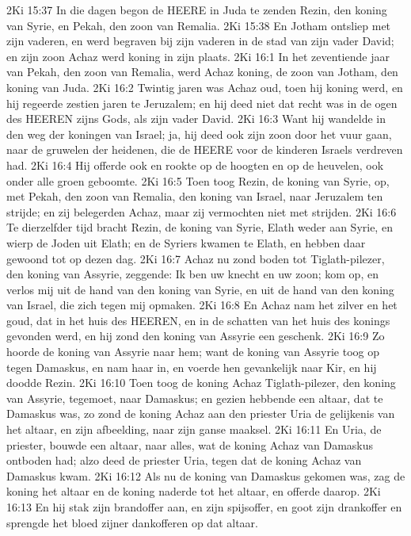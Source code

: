 2Ki 15:37  In die dagen begon de HEERE in Juda te zenden Rezin, den koning van Syrie, en Pekah, den zoon van Remalia.
2Ki 15:38  En Jotham ontsliep met zijn vaderen, en werd begraven bij zijn vaderen in de stad van zijn vader David; en zijn zoon Achaz werd koning in zijn plaats.
2Ki 16:1  In het zeventiende jaar van Pekah, den zoon van Remalia, werd Achaz koning, de zoon van Jotham, den koning van Juda.
2Ki 16:2  Twintig jaren was Achaz oud, toen hij koning werd, en hij regeerde zestien jaren te Jeruzalem; en hij deed niet dat recht was in de ogen des HEEREN zijns Gods, als zijn vader David.
2Ki 16:3  Want hij wandelde in den weg der koningen van Israel; ja, hij deed ook zijn zoon door het vuur gaan, naar de gruwelen der heidenen, die de HEERE voor de kinderen Israels verdreven had.
2Ki 16:4  Hij offerde ook en rookte op de hoogten en op de heuvelen, ook onder alle groen geboomte.
2Ki 16:5  Toen toog Rezin, de koning van Syrie, op, met Pekah, den zoon van Remalia, den koning van Israel, naar Jeruzalem ten strijde; en zij belegerden Achaz, maar zij vermochten niet met strijden.
2Ki 16:6  Te dierzelfder tijd bracht Rezin, de koning van Syrie, Elath weder aan Syrie, en wierp de Joden uit Elath; en de Syriers kwamen te Elath, en hebben daar gewoond tot op dezen dag.
2Ki 16:7  Achaz nu zond boden tot Tiglath-pilezer, den koning van Assyrie, zeggende: Ik ben uw knecht en uw zoon; kom op, en verlos mij uit de hand van den koning van Syrie, en uit de hand van den koning van Israel, die zich tegen mij opmaken.
2Ki 16:8  En Achaz nam het zilver en het goud, dat in het huis des HEEREN, en in de schatten van het huis des konings gevonden werd, en hij zond den koning van Assyrie een geschenk.
2Ki 16:9  Zo hoorde de koning van Assyrie naar hem; want de koning van Assyrie toog op tegen Damaskus, en nam haar in, en voerde hen gevankelijk naar Kir, en hij doodde Rezin.
2Ki 16:10  Toen toog de koning Achaz Tiglath-pilezer, den koning van Assyrie, tegemoet, naar Damaskus; en gezien hebbende een altaar, dat te Damaskus was, zo zond de koning Achaz aan den priester Uria de gelijkenis van het altaar, en zijn afbeelding, naar zijn ganse maaksel.
2Ki 16:11  En Uria, de priester, bouwde een altaar, naar alles, wat de koning Achaz van Damaskus ontboden had; alzo deed de priester Uria, tegen dat de koning Achaz van Damaskus kwam.
2Ki 16:12  Als nu de koning van Damaskus gekomen was, zag de koning het altaar en de koning naderde tot het altaar, en offerde daarop.
2Ki 16:13  En hij stak zijn brandoffer aan, en zijn spijsoffer, en goot zijn drankoffer en sprengde het bloed zijner dankofferen op dat altaar.

